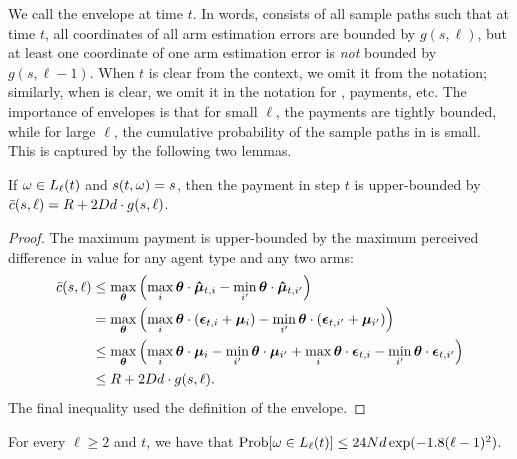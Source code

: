 We call \Env[t]{\ell} the \Kth{\ell} envelope at time $t$.
In words, \Env[t]{\ell} consists of all sample paths such that at time
$t$, all coordinates of all arm estimation errors are bounded by
$g(s, \ell)$, but at least one coordinate of one arm estimation error
is \emph{not} bounded by $g(s, \ell-1)$.
When $t$ is clear from the context, we omit it from the notation;
similarly, when \SP is clear, we omit it in the notation for
, payments, etc.
The importance of envelopes is that for small $\ell$, the payments are
tightly bounded, while for large $\ell$, the cumulative probability of
the sample paths in \Env[t]{\ell} is small.
This is captured by the following two lemmas.

\begin{lemma} \label{lem:sample-path-payment}
If $\SP \in \Env[t]{\ell}$ and $s(t,\omega) = s$, then
the payment in step $t$ is upper-bounded by
$\bar{c} (s,\ell) = R + 2 D d \cdot g(s,\ell)$.
\end{lemma}

\begin{proof}
The maximum payment is upper-bounded by the maximum perceived
difference in value for any agent type and any two arms:
\begin{align*}
\bar{c} (s, \ell) & \leq 
\max_{\bm{\theta}} \left(  \max_{i} \bm{\theta} \cdot \bm{\hat{\mu}}_{t,i}
                 - \min_{i'} \bm{\theta} \cdot \bm{\hat{\mu}}_{t,i'} \right) \\
& = \max_{\bm{\theta}} \left( \max_{i}\bm{\theta} \cdot (\bm{\epsilon}_{t,i}+\bm{\mu}_{i})
                    - \min_{i'}\bm{\theta} \cdot (\bm{\epsilon}_{t,i'}+\bm{\mu}_{i'}) \right) \\
& \leq \max_{\bm{\theta}} \left(  \max_{i} \bm{\theta} \cdot \bm{\mu}_{i}
                        - \min_{i'} \bm{\theta} \cdot \bm{\mu}_{i'}
                        + \max_{i} \bm{\theta} \cdot \bm{\epsilon}_{t,i}
                        - \min_{i'} \bm{\theta} \cdot \bm{\epsilon}_{t,i'} \right) \\
& \leq R + 2 D d \cdot g(s,\ell). 
\end{align*}
The final inequality used the definition of the envelope.
\end{proof}

\begin{lemma} \label{lem:envelope-probability}
For every $\ell \geq 2$ and $t$, we have that
$\Prob{\SP \in \Env[t]{\ell}} \leq 24 \ARMNUM d\exp(-1.8(\ell-1)^2)$. 
\end{lemma}

